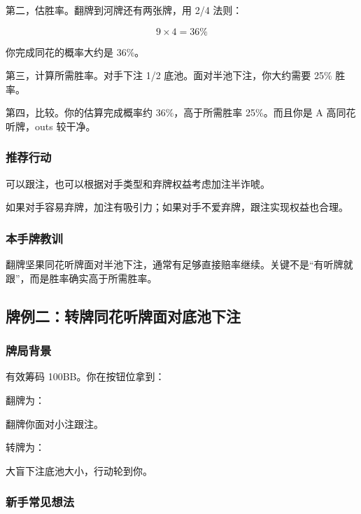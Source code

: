 第二，估胜率。翻牌到河牌还有两张牌，用 2/4 法则：

\[
9 \times 4 = 36\%
\]

你完成同花的概率大约是 36\%。

第三，计算所需胜率。对手下注 1/2 底池。面对半池下注，你大约需要 25\% 胜率。

第四，比较。你的估算完成概率约 36\%，高于所需胜率 25\%。而且你是 A 高同花听牌，outs 较干净。

\subsubsection*{推荐行动}

可以跟注，也可以根据对手类型和弃牌权益考虑加注半诈唬。

如果对手容易弃牌，加注有吸引力；如果对手不爱弃牌，跟注实现权益也合理。

\subsubsection*{本手牌教训}

翻牌坚果同花听牌面对半池下注，通常有足够直接赔率继续。关键不是“有听牌就跟”，而是胜率确实高于所需胜率。

\subsection{牌例二：转牌同花听牌面对底池下注}

\subsubsection*{牌局背景}

有效筹码 100BB。你在按钮位拿到：

\begin{center}
\end{center}

翻牌为：

\begin{center}
\end{center}

翻牌你面对小注跟注。

转牌为：

\begin{center}
\end{center}

大盲下注底池大小，行动轮到你。

\subsubsection*{新手常见想法}

